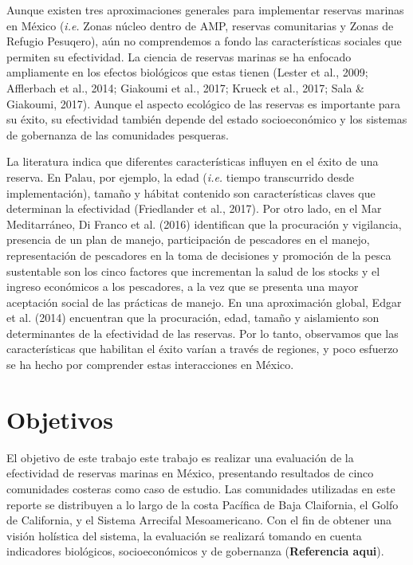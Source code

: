 \documentclass[12pt,]{article}
\begin{document}
Aunque existen tres aproximaciones generales para implementar reservas
marinas en México (\emph{i.e.} Zonas núcleo dentro de AMP, reservas
comunitarias y Zonas de Refugio Pesuqero), aún no comprendemos a fondo
las características sociales que permiten su efectividad. La ciencia de
reservas marinas se ha enfocado ampliamente en los efectos biológicos
que estas tienen (Lester et al., 2009; Afflerbach et al., 2014; Giakoumi
et al., 2017; Krueck et al., 2017; Sala \& Giakoumi, 2017). Aunque el
aspecto ecológico de las reservas es importante para su éxito, su
efectividad también depende del estado socioeconómico y los sistemas de
gobernanza de las comunidades pesqueras.

La literatura indica que diferentes características influyen en el éxito
de una reserva. En Palau, por ejemplo, la edad (\emph{i.e.} tiempo
transcurrido desde implementación), tamaño y hábitat contenido son
características claves que determinan la efectividad (Friedlander et
al., 2017). Por otro lado, en el Mar Meditarráneo, Di Franco et al.
(2016) identifican que la procuración y vigilancia, presencia de un plan
de manejo, participación de pescadores en el manejo, representación de
pescadores en la toma de decisiones y promoción de la pesca sustentable
son los cinco factores que incrementan la salud de los stocks y el
ingreso económicos a los pescadores, a la vez que se presenta una mayor
aceptación social de las prácticas de manejo. En una aproximación
global, Edgar et al. (2014) encuentran que la procuración, edad, tamaño
y aislamiento son determinantes de la efectividad de las reservas. Por
lo tanto, observamos que las características que habilitan el éxito
varían a través de regiones, y poco esfuerzo se ha hecho por comprender
estas interacciones en México.

\section{Objetivos}\label{objetivos}

El objetivo de este trabajo este trabajo es realizar una evaluación de
la efectividad de reservas marinas en México, presentando resultados de
cinco comunidades costeras como caso de estudio. Las comunidades
utilizadas en este reporte se distribuyen a lo largo de la costa
Pacífica de Baja Claifornia, el Golfo de California, y el Sistema
Arrecifal Mesoamericano. Con el fin de obtener una visión holística del
sistema, la evaluación se realizará tomando en cuenta indicadores
biológicos, socioeconómicos y de gobernanza (\textbf{Referencia aqui}).
\end{document}

